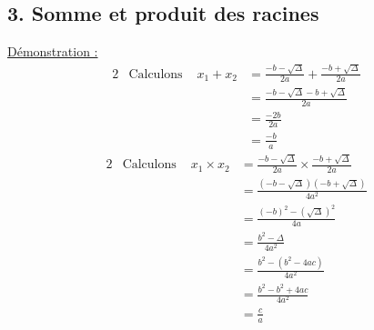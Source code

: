 \documentclass[11pt,a4paper]{article}
\begin{document}
\subsection*{3. Somme et produit des racines}
\underline{Démonstration :}
\begin{alignat*}{2}
     & \text{Calculons } & x_1+x_2 & = \frac{-b-\sqrt{\Delta}}{2a} + \frac{-b+\sqrt{\Delta}}{2a} \\
     &                   &         & = \frac{-b-\sqrt{\Delta}-b+\sqrt{\Delta}}{2a}               \\
     &                   &         & = \frac{-2b}{2a} \\
     &                   &         & = \frac{-b}{a}
\end{alignat*}
\begin{alignat*}{2}
     & \text{Calculons } & x_1\times x_2 & = \frac{-b-\sqrt{\Delta}}{2a} \times \frac{-b+\sqrt{\Delta}}{2a} \\
     &                   &               & = \frac{(-b-\sqrt{\Delta})(-b+\sqrt{\Delta})}{4a^2}              \\
     &                   &               & = \frac{(-b)^2-(\sqrt{\Delta})^2}{4a}                            \\
     &                   &               & = \frac{b^2-\Delta}{4a^2}                                        \\
     &                   &               & = \frac{b^2-(b^2-4ac)}{4a^2}                                     \\
     &                   &               & = \frac{b^2-b^2+4ac}{4a^2}                                       \\
     &                   &               & = \frac{c}{a}
\end{alignat*}
\end{document}
